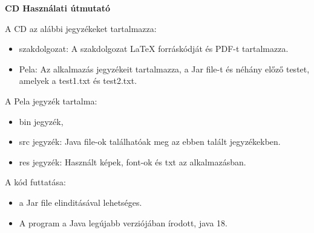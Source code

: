 \pagestyle{empty}

\noindent \textbf{\Large CD Használati útmutató}

\vskip 1cm

A CD az alábbi jegyzékeket tartalmazza:

\begin{itemize}
    \item szakdolgozat: A szakdolgozat LaTeX forráskódját és PDF-t tartalmazza.
    \item Pela: Az alkalmazás jegyzékeit tartalmazza, a Jar file-t és néhány előző testet, amelyek a test1.txt és test2.txt.
\end{itemize}

A Pela jegyzék tartalma:

\begin{itemize}
    \item bin jegyzék,
    \item src jegyzék: Java file-ok találhatóak meg az ebben talált jegyzékekben.
    \item res jegyzék: Használt képek, font-ok és txt az alkalmazásban.
\end{itemize}

A kód futtatása:

\begin{itemize}
    \item a Jar file elinditásával lehetséges.
    \item A program a Java legújabb verziójában írodott, java 18.
\end{itemize}

